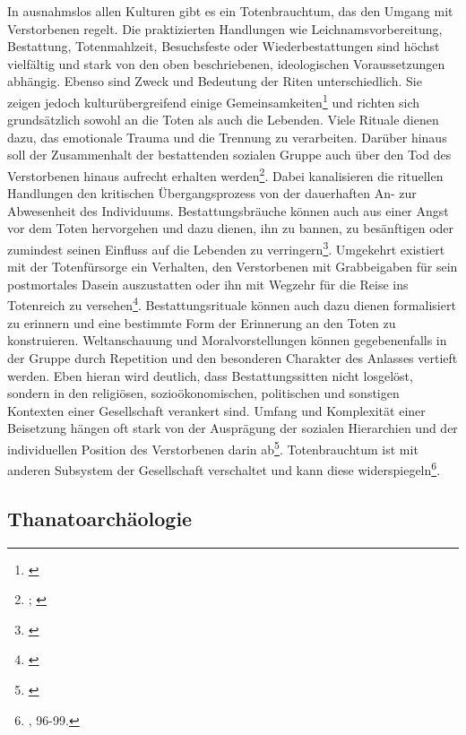 \documentclass[openany,twoside,twocolumn]{book}
\let\rmarkdownfootnote\footnote%
\def\footnote{\protect\rmarkdownfootnote}
\begin{document}
In ausnahmslos allen Kulturen gibt es ein Totenbrauchtum, das den Umgang mit Verstorbenen regelt. Die praktizierten Handlungen wie Leichnamsvorbereitung, Bestattung, Totenmahlzeit, Besuchsfeste oder Wiederbestattungen sind höchst vielfältig und stark von den oben beschriebenen, ideologischen Voraussetzungen abhängig. Ebenso sind Zweck und Bedeutung der Riten unterschiedlich. Sie zeigen jedoch kulturübergreifend einige Gemeinsamkeiten\footnote{\textcite{macho_stichwort_1997}} und richten sich grundsätzlich sowohl an die Toten als auch die Lebenden. Viele Rituale dienen dazu, das emotionale Trauma und die Trennung zu verarbeiten. Darüber hinaus soll der Zusammenhalt der bestattenden sozialen Gruppe auch über den Tod des Verstorbenen hinaus aufrecht erhalten werden\footnote{\textcite{gladigow_naturae_1997}; \textcite{hasenfratz_zum_1983}}. Dabei kanalisieren die rituellen Handlungen den kritischen Übergangsprozess von der dauerhaften An- zur Abwesenheit des Individuums. Bestattungsbräuche können auch aus einer Angst vor dem Toten hervorgehen und dazu dienen, ihn zu bannen, zu besänftigen oder zumindest seinen Einfluss auf die Lebenden zu verringern\footnote{\textcite{lauf_im_1997}}. Umgekehrt existiert mit der Totenfürsorge ein Verhalten, den Verstorbenen mit Grabbeigaben für sein postmortales Dasein auszustatten oder ihn mit Wegzehr für die Reise ins Totenreich zu versehen\footnote{\textcite{nebelsick_doppelte_1995}}. Bestattungsrituale können auch dazu dienen formalisiert zu erinnern und eine bestimmte Form der Erinnerung an den Toten zu konstruieren. Weltanschauung und Moralvorstellungen können gegebenenfalls in der Gruppe durch Repetition und den besonderen Charakter des Anlasses vertieft werden. Eben hieran wird deutlich, dass Bestattungssitten nicht losgelöst, sondern in den religiösen, sozioökonomischen, politischen und sonstigen Kontexten einer Gesellschaft verankert sind. Umfang und Komplexität einer Beisetzung hängen oft stark von der Ausprägung der sozialen Hierarchien und der individuellen Position des Verstorbenen darin ab\footnote{\textcite{harke_final_1997}}. Totenbrauchtum ist mit anderen Subsystem der Gesellschaft verschaltet und kann diese widerspiegeln\footnote{\textcite{hofmann_rituelle_2008}, 96-99.}.

\hypertarget{archaeology-of-death}{%
\subsection{Thanatoarchäologie}\label{archaeology-of-death}}
\end{document}
